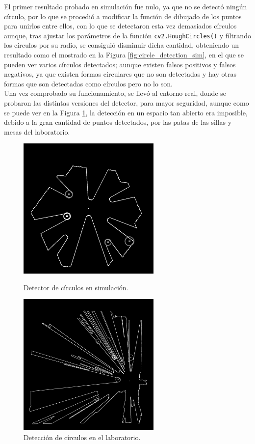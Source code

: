 El primer resultado probado en simulación fue nulo, ya que no se detectó ningún
círculo, por lo que se procedió a modificar la función de dibujado de los puntos
para unirlos entre ellos, con lo que se detectaron esta vez demasiados círculos
aunque, tras ajustar los parámetros de la función \verb|cv2.HoughCircles()| y
filtrando los círculos por su radio, se consiguió disminuir dicha cantidad,
obteniendo un resultado como el mostrado en la Figura
\ref{fig:circle_detection_sim}, en el que se pueden ver varios círculos
detectados; aunque existen falsos positivos y falsos negativos, ya que existen
formas circulares que no son detectadas y hay otras formas que son detectadas
como círculos pero no lo son.
\\

Una vez comprobado su funcionamiento, se llevó al entorno real, donde se
probaron las distintas versiones del detector, para mayor seguridad, aunque como
se puede ver en la Figura \ref{fig:circle_detection_lab}, la detección en un
espacio tan abierto era imposible, debido a la gran cantidad de puntos
detectados, por las patas de las sillas y mesas del laboratorio.

\begin{figure}[h!]
  \centering
  \begin{minipage}{0.45\textwidth}
    \centering
    \includegraphics[width=7cm]{figs/circle_detection_sim}
    \caption{Detector de círculos en simulación.}
    \label{fig:circle_detection_sim}
  \end{minipage}
  \hfill
  \begin{minipage}{0.45\textwidth}
    \centering
    \includegraphics[width=7cm]{figs/circle_detection_lab}
    \caption{Detección de círculos en el laboratorio.}
    \label{fig:circle_detection_lab}
  \end{minipage}
\end{figure}\

